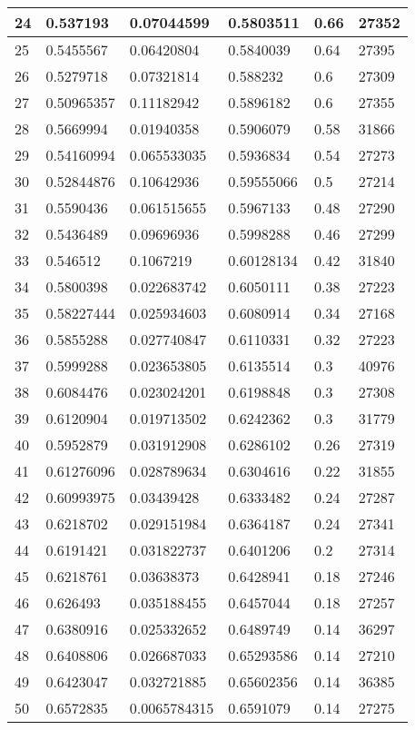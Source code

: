 \begin{longtable}{|l|l|l|l|l|l|}
24 & 0.537193 & 0.07044599 & 0.5803511 & 0.66 & 27352 \\ \hline 
25 & 0.5455567 & 0.06420804 & 0.5840039 & 0.64 & 27395 \\ \hline 
26 & 0.5279718 & 0.07321814 & 0.588232 & 0.6 & 27309 \\ \hline 
27 & 0.50965357 & 0.11182942 & 0.5896182 & 0.6 & 27355 \\ \hline 
28 & 0.5669994 & 0.01940358 & 0.5906079 & 0.58 & 31866 \\ \hline 
29 & 0.54160994 & 0.065533035 & 0.5936834 & 0.54 & 27273 \\ \hline 
30 & 0.52844876 & 0.10642936 & 0.59555066 & 0.5 & 27214 \\ \hline 
31 & 0.5590436 & 0.061515655 & 0.5967133 & 0.48 & 27290 \\ \hline 
32 & 0.5436489 & 0.09696936 & 0.5998288 & 0.46 & 27299 \\ \hline 
33 & 0.546512 & 0.1067219 & 0.60128134 & 0.42 & 31840 \\ \hline 
34 & 0.5800398 & 0.022683742 & 0.6050111 & 0.38 & 27223 \\ \hline 
35 & 0.58227444 & 0.025934603 & 0.6080914 & 0.34 & 27168 \\ \hline 
36 & 0.5855288 & 0.027740847 & 0.6110331 & 0.32 & 27223 \\ \hline 
37 & 0.5999288 & 0.023653805 & 0.6135514 & 0.3 & 40976 \\ \hline 
38 & 0.6084476 & 0.023024201 & 0.6198848 & 0.3 & 27308 \\ \hline 
39 & 0.6120904 & 0.019713502 & 0.6242362 & 0.3 & 31779 \\ \hline 
40 & 0.5952879 & 0.031912908 & 0.6286102 & 0.26 & 27319 \\ \hline 
41 & 0.61276096 & 0.028789634 & 0.6304616 & 0.22 & 31855 \\ \hline 
42 & 0.60993975 & 0.03439428 & 0.6333482 & 0.24 & 27287 \\ \hline 
43 & 0.6218702 & 0.029151984 & 0.6364187 & 0.24 & 27341 \\ \hline 
44 & 0.6191421 & 0.031822737 & 0.6401206 & 0.2 & 27314 \\ \hline 
45 & 0.6218761 & 0.03638373 & 0.6428941 & 0.18 & 27246 \\ \hline 
46 & 0.626493 & 0.035188455 & 0.6457044 & 0.18 & 27257 \\ \hline 
47 & 0.6380916 & 0.025332652 & 0.6489749 & 0.14 & 36297 \\ \hline 
48 & 0.6408806 & 0.026687033 & 0.65293586 & 0.14 & 27210 \\ \hline 
49 & 0.6423047 & 0.032721885 & 0.65602356 & 0.14 & 36385 \\ \hline 
50 & 0.6572835 & 0.0065784315 & 0.6591079 & 0.14 & 27275 \\ \hline 
\end{longtable}